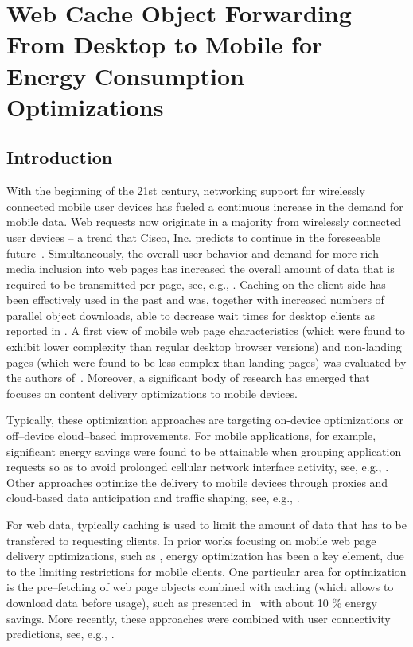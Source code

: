 \chapter{Web Cache Object Forwarding From Desktop to Mobile for Energy Consumption Optimizations}
\section*{Introduction}
With the beginning of the 21st century, networking support for wirelessly connected mobile user devices has fueled a continuous increase in the demand for mobile data.
Web requests now originate in a majority from wirelessly connected user devices -- a trend that Cisco, Inc. predicts to continue in the foreseeable future~\cite{VNI14}.
Simultaneously, the overall user behavior and demand for more rich media inclusion into web pages has increased the overall amount of data that is required to be transmitted per page, see, e.g., \cite{IhPa11,BuMaSe13}.
Caching on the client side has been effectively used in the past and was, together with increased numbers of parallel object downloads, able to decrease wait times for desktop clients as reported in \cite{IhPa11}.
A first view of mobile web page characteristics (which were found to exhibit lower complexity than regular desktop browser versions) and non-landing pages (which were found to be less complex than landing pages) was evaluated by the authors of~\cite{BuMaSe13}.
Moreover, a significant body of research has emerged that focuses on content delivery optimizations to mobile devices.

Typically, these optimization approaches are targeting on-device optimizations or off--device cloud--based improvements.
For mobile applications, for example, significant energy savings were found to be attainable when grouping application requests so as to avoid prolonged cellular network interface activity, see, e.g., \cite{BaBaVe09,QiWaGaHuGe12}.
Other approaches optimize the delivery to mobile devices through proxies and cloud-based data anticipation and traffic shaping, see, e.g., \cite{XiHuSaYl11}.

For web data, typically caching is used to limit the amount of data that has to be transfered to requesting clients.
In prior works focusing on mobile web page delivery optimizations, such as \cite{SaIs02}, energy optimization has been a key element, due to the limiting restrictions for mobile clients.
One particular area for optimization is the pre--fetching of web page objects combined with caching (which allows to download data before usage), such as presented in~\cite{ShKuDaWa05} with about 10 \% energy savings.
More recently, these approaches were combined with user connectivity predictions, see, e.g., \cite{ThChWo13}.

